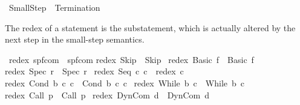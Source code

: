 %
\begin{isabellebody}%
%
%
\isamarkuptrue%
%
\isadelimtheory
%
\endisadelimtheory
%
\isatagtheory
{}\isamarkupfalse%
\ SmallStep\ \ Termination\isanewline
{}%
\endisatagtheory
{\isafoldtheory}%
%
\isadelimtheory
%
\endisadelimtheory
%
\begin{isamarkuptext}%
The redex of a statement is the substatement, which is actually altered
by the next step in the small-step semantics.%
\end{isamarkuptext}\isamarkuptrue%
\isamarkupfalse%
\ redex{\isacharcolon}{\isacharcolon}\ {\isachardoublequoteopen}{\isacharparenleft}{\isacharprime}s{\isacharcomma}{\isacharprime}p{\isacharcomma}{\isacharprime}f{\isacharparenright}com\ {\isasymRightarrow}\ {\isacharparenleft}{\isacharprime}s{\isacharcomma}{\isacharprime}p{\isacharcomma}{\isacharprime}f{\isacharparenright}com{\isachardoublequoteclose}\isanewline
{}\isanewline
{\isachardoublequoteopen}redex\ Skip\ {\isacharequal}\ Skip{\isachardoublequoteclose}\ {\isacharbar}\isanewline
{\isachardoublequoteopen}redex\ {\isacharparenleft}Basic\ f{\isacharparenright}\ {\isacharequal}\ {\isacharparenleft}Basic\ f{\isacharparenright}{\isachardoublequoteclose}\ {\isacharbar}\isanewline
{\isachardoublequoteopen}redex\ {\isacharparenleft}Spec\ r{\isacharparenright}\ {\isacharequal}\ {\isacharparenleft}Spec\ r{\isacharparenright}{\isachardoublequoteclose}\ {\isacharbar}\isanewline
{\isachardoublequoteopen}redex\ {\isacharparenleft}Seq\ c\ c\ {\isacharequal}\ redex\ c\ {\isacharbar}\isanewline
{\isachardoublequoteopen}redex\ {\isacharparenleft}Cond\ b\ c\ c\ {\isacharequal}\ {\isacharparenleft}Cond\ b\ c\ c\ {\isacharbar}\isanewline
{\isachardoublequoteopen}redex\ {\isacharparenleft}While\ b\ c{\isacharparenright}\ {\isacharequal}\ {\isacharparenleft}While\ b\ c{\isacharparenright}{\isachardoublequoteclose}\ {\isacharbar}\isanewline
{\isachardoublequoteopen}redex\ {\isacharparenleft}Call\ p{\isacharparenright}\ {\isacharequal}\ {\isacharparenleft}Call\ p{\isacharparenright}{\isachardoublequoteclose}\ {\isacharbar}\isanewline
{\isachardoublequoteopen}redex\ {\isacharparenleft}DynCom\ d{\isacharparenright}\ {\isacharequal}\ {\isacharparenleft}DynCom\ d{\isacharparenright}{\isachardoublequoteclose}\ {\isacharbar}\isanewline

\end{isabellebody}
